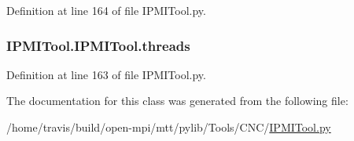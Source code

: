 Definition at line 164 of file I\-P\-M\-I\-Tool.\-py.

\hypertarget{class_i_p_m_i_tool_1_1_i_p_m_i_tool_a2f6ca8b0b509ba2c514b72312841b2d6}{
\subsubsection[{threads}]{\setlength{\rightskip}{0pt plus 5cm}I\-P\-M\-I\-Tool.\-I\-P\-M\-I\-Tool.\-threads}}\label{class_i_p_m_i_tool_1_1_i_p_m_i_tool_a2f6ca8b0b509ba2c514b72312841b2d6}


Definition at line 163 of file I\-P\-M\-I\-Tool.\-py.



The documentation for this class was generated from the following file\-:\begin{DoxyCompactItemize}
\item 
/home/travis/build/open-\/mpi/mtt/pylib/\-Tools/\-C\-N\-C/\hyperlink{_i_p_m_i_tool_8py}{I\-P\-M\-I\-Tool.\-py}\end{DoxyCompactItemize}
